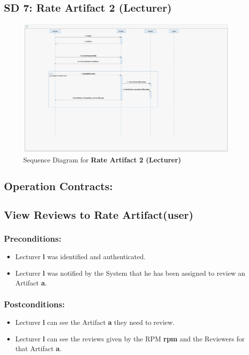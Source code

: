 \newpage

\subsection*{SD 7: Rate Artifact 2 (Lecturer)}

\begin{figure}[h]
\includegraphics[width=16cm]{SD_RateArtifact(Lecturer).jpeg}
\centering
\caption{Sequence Diagram for \textbf{Rate Artifact 2 (Lecturer)}}
\end{figure}

\subsection*{Operation Contracts:}
\subsection*{View Reviews to Rate Artifact(user)}
\subsubsection*{Preconditions:}
\begin{itemize}
\itemsep-1.5em 
    \item Lecturer \textbf{l} was identified and authenticated.
    \item Lecturer \textbf{l} was notified by the System that he has been assigned to review an Artifact \textbf{a}.
\end{itemize}



\subsubsection*{Postconditions:}
\begin{itemize}
\itemsep-1.5em 
    \item Lecturer \textbf{l} can see the Artifact \textbf{a} they need to review.
    \item Lecturer \textbf{l} can see the reviews given by the RPM \textbf{rpm} and the Reviewers for that Artifact \textbf{a}.
\end{itemize}

